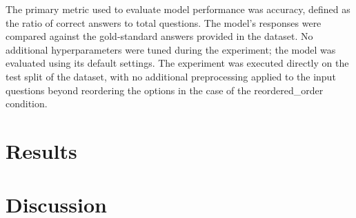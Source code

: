 \documentclass{article}
\begin{document}
The primary metric used to evaluate model performance was accuracy, defined as the ratio of correct answers to total questions. The model's responses were compared against the gold-standard answers provided in the dataset. No additional hyperparameters were tuned during the experiment; the model was evaluated using its default settings. The experiment was executed directly on the test split of the dataset, with no additional preprocessing applied to the input questions beyond reordering the options in the case of the reordered_order condition.
\section{Results}

\section{Discussion}
\end{document}
